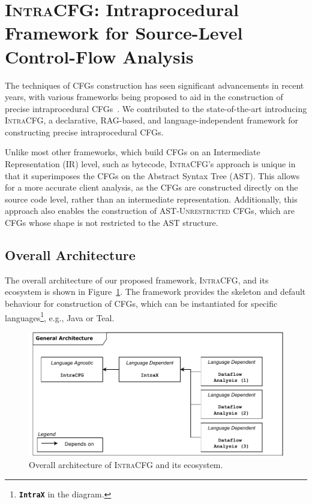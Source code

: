 \section{\textsc{IntraCFG}: Intraprocedural Framework for Source-Level Control-Flow Analysis}
\label{sec:IntraCFG}
The techniques of CFGs construction has seen significant advancements
in recent years, with various frameworks being proposed to aid in the construction 
of precise intraprocedural CFGs~\cite{smits2020flowspec,10.1016/j.scico.2012.02.002}.
We contributed to the state-of-the-art introducing \textsc{IntraCFG}, a declarative, RAG-based,
and language-independent framework for constructing precise intraprocedural CFGs.

Unlike most other frameworks, which build CFGs on an Intermediate Representation (IR) level,
such as bytecode, \textsc{IntraCFG}'s approach is unique in that it superimposes the CFGs 
on the Abstract Syntax Tree (AST). This allows for a more accurate client analysis,
as the CFGs are constructed directly on the source code level, rather than an
intermediate representation. Additionally, this approach also enables the construction 
of \textsc{AST-Unrestricted} CFGs, which are CFGs whose shape is not restricted to the AST structure.
\subsection{Overall Architecture}
The overall architecture of our proposed framework, \textsc{IntraCFG}, and its
ecosystem is shown in Figure~\ref{fig:intraCFG}. 
The framework provides the skeleton and default behaviour for construction of CFGs,
which can be instantiated for specific languages\footnote{\textbf{\texttt{IntraX}} in the diagram.}, e.g., Java or Teal. 
\begin{figure}[H]
    \centering
    \includegraphics[scale=0.7]{kappa/img/architecture.pdf}
    \caption{\label{fig:intraCFG} Overall architecture of \textsc{IntraCFG} and its ecosystem.}
\end{figure}


